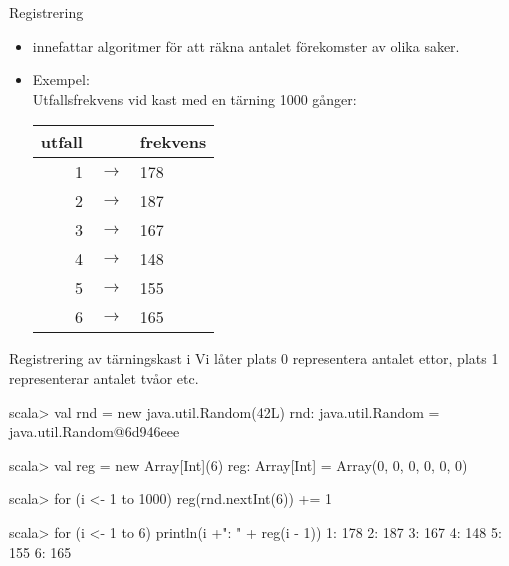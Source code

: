

\ifkompendium\else


\begin{Slide}{Registrering}
\begin{itemize}
\item {} innefattar algoritmer för att räkna antalet förekomster av olika saker.

\item Exempel: 
\\\vspace{0.5em}Utfallsfrekvens vid kast med en tärning 1000 gånger:

\begin{tabular}{r c l}
utfall & & frekvens \\ \hline
1 & $\rightarrow$ & 178 \\
2 & $\rightarrow$ & 187 \\
3 & $\rightarrow$ & 167 \\
4 & $\rightarrow$ & 148 \\
5 & $\rightarrow$ & 155 \\
6 & $\rightarrow$ & 165 \\
\end{tabular}
\end{itemize}
\end{Slide}

\begin{Slide}{Registrering av tärningskast i }
Vi låter plats 0 representera antalet ettor, plats 1 representerar antalet tvåor etc.
\begin{REPLnonum}
scala> val rnd = new java.util.Random(42L)
rnd: java.util.Random = java.util.Random@6d946eee

scala> val reg = new Array[Int](6)
reg: Array[Int] = Array(0, 0, 0, 0, 0, 0)

scala> for (i <- 1 to 1000) reg(rnd.nextInt(6)) += 1

scala> for (i <- 1 to 6) println(i +": " + reg(i - 1))
1: 178
2: 187
3: 167
4: 148
5: 155
6: 165
\end{REPLnonum}
\end{Slide}

